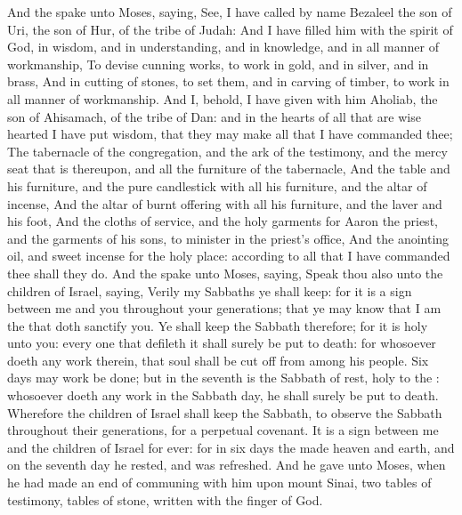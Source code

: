 \begin{biblechapter} %
 And the \LORD spake unto Moses, saying,
\verse See, I have called by name Bezaleel the son of Uri, the son of Hur, of the tribe of Judah:
\verse And I have filled him with the spirit of God, in wisdom, and in understanding, and in knowledge, and in all manner of workmanship,
\verse To devise cunning works, to work in gold, and in silver, and in brass,
\verse And in cutting of stones, to set them, and in carving of timber, to work in all manner of workmanship.
\verse And I, behold, I have given with him Aholiab, the son of Ahisamach, of the tribe of Dan: and in the hearts of all that are wise hearted I have put wisdom, that they may make all that I have commanded thee;
\verse The tabernacle of the congregation, and the ark of the testimony, and the mercy seat that is thereupon, and all the furniture of the tabernacle,
\verse And the table and his furniture, and the pure candlestick with all his furniture, and the altar of incense,
\verse And the altar of burnt offering with all his furniture, and the laver and his foot,
\verse And the cloths of service, and the holy garments for Aaron the priest, and the garments of his sons, to minister in the priest's office,
\verse And the anointing oil, and sweet incense for the holy place: according to all that I have commanded thee shall they do.
 And the \LORD spake unto Moses, saying,
\verse Speak thou also unto the children of Israel, saying, Verily my Sabbaths ye shall keep: for it is a sign between me and you throughout your generations; that ye may know that I am the \LORD that doth sanctify you.
\verse Ye shall keep the Sabbath therefore; for it is holy unto you: every one that defileth it shall surely be put to death: for whosoever doeth any work therein, that soul shall be cut off from among his people.
\verse Six days may work be done; but in the seventh is the Sabbath of rest, holy to the \LORD: whosoever doeth any work in the Sabbath day, he shall surely be put to death.
\verse Wherefore the children of Israel shall keep the Sabbath, to observe the Sabbath throughout their generations, for a perpetual covenant.
\verse It is a sign between me and the children of Israel for ever: for in six days the \LORD made heaven and earth, and on the seventh day he rested, and was refreshed.
\verse And he gave unto Moses, when he had made an end of communing with him upon mount Sinai, two tables of testimony, tables of stone, written with the finger of God.
\end{biblechapter}

